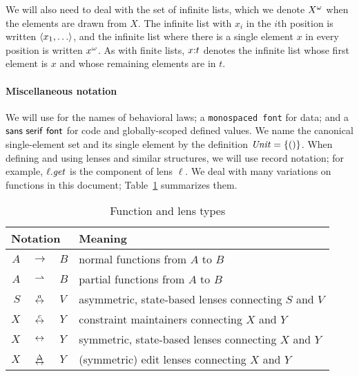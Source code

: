 We will also need to deal with the set of infinite lists, which we denote
$X^\omega$ when the elements are drawn from $X$. The infinite list with $x_i$
in the $i$th position is written $\left< x_1 ,\ldots\right>$, and the infinite list
where there is a single element $x$ in every position is written $x^\omega$.
As with finite lists, $x \mathord{:} t$ denotes the infinite list whose first
element is $x$ and whose remaining elements are in $t$.

\paragraph*{Miscellaneous notation}
We will use  for the names of behavioral laws; a
\texttt{monospaced font} for data; and a $\mathsf{sans\ serif\ font}$ for code
and globally-scoped defined values. We name the canonical single-element set
and its single element by the definition $\mathit{Unit}=\{{()}\}$. When defining
and using lenses and similar structures, we will use record notation; for
example, $\ell.\mathit{get}$ is the \GET component of lens $\ell$. We deal with
many variations on functions in this document; Table~\ref{tab:arrows}
summarizes them.

\begin{table}
    \centering
    \begin{tabular}{r@{}c@{}l|l}
        \multicolumn{3}{l|}{Notation} & Meaning \\
        \hline
        $A$ & ${}\to       {}$ & $B$ & normal functions from $A$ to $B$ \\
        $A$ & ${}\rightharpoonup{}$ & $B$ & partial functions from $A$ to $B$ \\
        $S$ & ${}\overset{a}{\leftrightarrow}    {}$ & $V$ & asymmetric, state-based lenses connecting $S$ and $V$ \\
        $X$ & ${}\overset{c}{\leftrightarrow}   {}$ & $Y$ & constraint maintainers connecting $X$ and $Y$ \\
        $X$ & ${}\leftrightarrow     {}$ & $Y$ & symmetric, state-based lenses connecting $X$ and $Y$ \\
        $X$ & ${}\overset{\Delta}{\leftrightarrow}    {}$ & $Y$ & (symmetric) edit lenses connecting $X$ and $Y$
    \end{tabular}
    \caption{Function and lens types}
    \label{tab:arrows}
\end{table}
